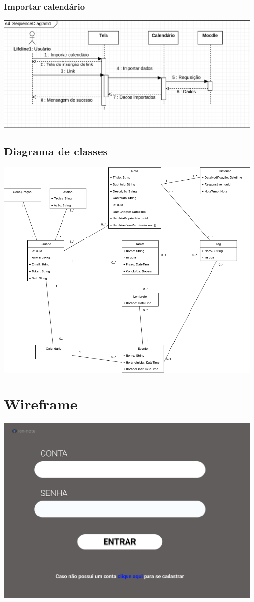 \documentclass[
	12pt,				%
	openright,			%
	oneside,			    %
	a4paper,				%
	english,			%
	french,			%
	spanish,			%
	brazil			%
	]{abntex2}
\begin{document}
\subsection{Importar calendário}
\includegraphics[scale=0.4]{Imagens/UC2-SEQ.png}

\section{Diagrama de classes}
\includegraphics[scale=0.4]{Imagens/diagramaClasse.drawio.png}

\chapter{Wireframe}
\includegraphics[scale=0.3]{Imagens/Login.png}
\end{document}
